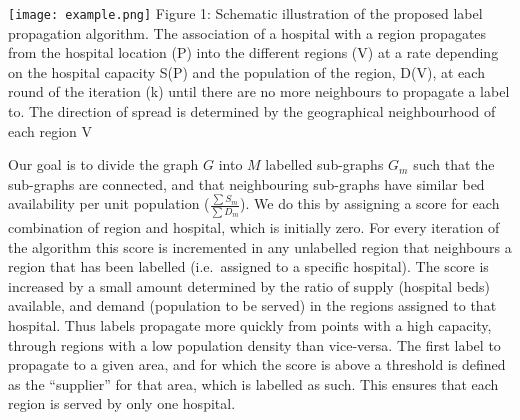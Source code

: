 \documentclass[
]{article}
\begin{document}
\texttt{[image: example.png]} Figure 1: Schematic illustration of the
proposed label propagation algorithm. The association of a hospital with
a region propagates from the hospital location (P) into the different
regions (V) at a rate depending on the hospital capacity S(P) and the
population of the region, D(V), at each round of the iteration (k) until
there are no more neighbours to propagate a label to. The direction of
spread is determined by the geographical neighbourhood of each region V

Our goal is to divide the graph \(G\) into \(M\) labelled sub-graphs
\(G_m\) such that the sub-graphs are connected, and that neighbouring
sub-graphs have similar bed availability per unit population
(\(\frac{\sum S_m}{\sum D_m}\)). We do this by assigning a score for
each combination of region and hospital, which is initially zero. For
every iteration of the algorithm this score is incremented in any
unlabelled region that neighbours a region that has been labelled
(i.e.~assigned to a specific hospital). The score is increased by a
small amount determined by the ratio of supply (hospital beds)
available, and demand (population to be served) in the regions assigned
to that hospital. Thus labels propagate more quickly from points with a
high capacity, through regions with a low population density than
vice-versa. The first label to propagate to a given area, and for which
the score is above a threshold is defined as the ``supplier'' for that
area, which is labelled as such. This ensures that each region is served
by only one hospital.
\end{document}
